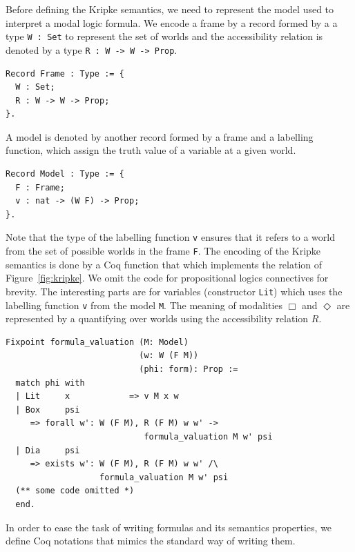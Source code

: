\documentclass[sigconf]{acmart}
\begin{document}
Before defining the Kripke semantics, we need to represent the model used to
interpret a modal logic formula. We encode a frame by a record formed by a
a type \texttt{W : Set} to represent the set of worlds and the
accessibility relation is denoted by a type \texttt{R : W -> W -> Prop}.
\begin{verbatim}
Record Frame : Type := {
  W : Set;
  R : W -> W -> Prop;
}.
\end{verbatim}
A model is denoted by another record formed by a frame and a labelling function,
which assign the truth value of a variable at a given world.
\begin{verbatim}
Record Model : Type := {
  F : Frame; 
  v : nat -> (W F) -> Prop; 
}.
\end{verbatim}
Note that the type of the labelling function \texttt{v} ensures that it
refers to a world from the set of possible worlds in the frame
\texttt{F}. The encoding of the Kripke semantics is done by a Coq function
that which implements the relation of Figure~\ref{fig:kripke}. We omit the code
for propositional logics connectives for brevity. The interesting parts are for
variables (constructor \texttt{Lit}) which uses the labelling function
\texttt{v} from the model \texttt{M}. The meaning of
modalities $\Box$ and $\Diamond$ are represented by a quantifying over worlds
using the accessibility relation $R$. 
\begin{verbatim}
Fixpoint formula_valuation (M: Model)
                           (w: W (F M))
                           (phi: form): Prop :=
  match phi with
  | Lit     x            => v M x w 
  | Box     psi
     => forall w': W (F M), R (F M) w w' ->
                            formula_valuation M w' psi
  | Dia     psi
     => exists w': W (F M), R (F M) w w' /\
                   formula_valuation M w' psi
  (** some code omitted *)
  end.
\end{verbatim}
In order to ease the task of writing formulas and its semantics properties, we
define Coq notations that mimics the standard way of writing them.
\end{document}
